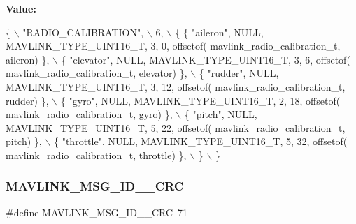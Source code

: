 {\bfseries Value\+:}
\begin{DoxyCode}
\{ \(\backslash\)
    \textcolor{stringliteral}{"RADIO\_CALIBRATION"}, \(\backslash\)
    6, \(\backslash\)
    \{  \{ \textcolor{stringliteral}{"aileron"}, NULL, MAVLINK_TYPE_UINT16_T, 3, 0, offsetof(
      mavlink_radio_calibration_t, aileron) \}, \(\backslash\)
         \{ \textcolor{stringliteral}{"elevator"}, NULL, MAVLINK_TYPE_UINT16_T, 3, 6, offsetof(
      mavlink_radio_calibration_t, elevator) \}, \(\backslash\)
         \{ \textcolor{stringliteral}{"rudder"}, NULL, MAVLINK_TYPE_UINT16_T, 3, 12, offsetof(
      mavlink_radio_calibration_t, rudder) \}, \(\backslash\)
         \{ \textcolor{stringliteral}{"gyro"}, NULL, MAVLINK_TYPE_UINT16_T, 2, 18, offsetof(
      mavlink_radio_calibration_t, gyro) \}, \(\backslash\)
         \{ \textcolor{stringliteral}{"pitch"}, NULL, MAVLINK_TYPE_UINT16_T, 5, 22, offsetof(
      mavlink_radio_calibration_t, pitch) \}, \(\backslash\)
         \{ \textcolor{stringliteral}{"throttle"}, NULL, MAVLINK_TYPE_UINT16_T, 5, 32, offsetof(
      mavlink_radio_calibration_t, throttle) \}, \(\backslash\)
         \} \(\backslash\)
\}
\end{DoxyCode}
\mbox{\label{mavlink__msg__radio__calibration_8h_a81b613323348aa237b6760ecee35c342}} 
\subsubsection{M\+A\+V\+L\+I\+N\+K\+\_\+\+M\+S\+G\+\_\+\+I\+D\+\_\+\_\+\+C\+RC}
{\footnotesize\ttfamily \#define M\+A\+V\+L\+I\+N\+K\+\_\+\+M\+S\+G\+\_\+\+I\+D\+\_\+\_\+\+C\+RC~71}

\mbox{\label{mavlink__msg__radio__calibration_8h_a1aa3b509da2eff7e7c9027e670839d22}} 
